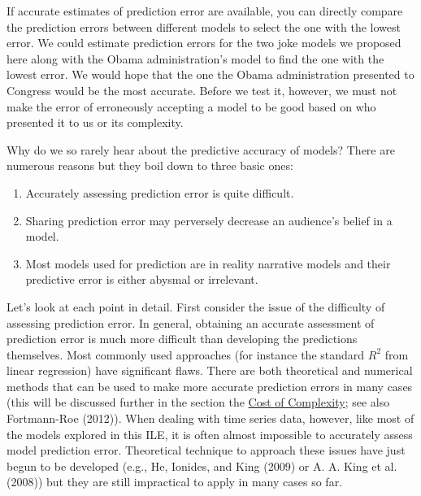 \documentclass[]{memoir}
\begin{document}
If accurate estimates of prediction error are available, you can
directly compare the prediction errors between different models to
select the one with the lowest error. We could estimate prediction
errors for the two joke models we proposed here along with the Obama
administration's model to find the one with the lowest error. We would
hope that the one the Obama administration presented to Congress would
be the most accurate. Before we test it, however, we must not make the
error of erroneously accepting a model to be good based on who presented
it to us or its complexity.

Why do we so rarely hear about the predictive accuracy of models? There
are numerous reasons but they boil down to three basic ones:

\begin{enumerate}
\def\labelenumi{\arabic{enumi}.}
\itemsep1pt\parskip0pt
\item
  Accurately assessing prediction error is quite difficult.
\item
  Sharing prediction error may perversely decrease an audience's belief
  in a model.
\item
  Most models used for prediction are in reality narrative models and
  their predictive error is either abysmal or irrelevant.
\end{enumerate}

Let's look at each point in detail. First consider the issue of the
difficulty of assessing prediction error. In general, obtaining an
accurate assessment of prediction error is much more difficult than
developing the predictions themselves. Most commonly used approaches
(for instance the standard $R^2$ from linear regression) have
significant flaws. There are both theoretical and numerical methods that
can be used to make more accurate prediction errors in many cases (this
will be discussed further in the section the
\hyperref[ComplexityCost]{Cost of Complexity}; see also Fortmann-Roe
(2012)). When dealing with time series data, however, like most of the
models explored in this ILE, it is often almost impossible to accurately
assess model prediction error. Theoretical technique to approach these
issues have just begun to be developed (e.g., He, Ionides, and King
(2009) or A. A. King et al. (2008)) but they are still impractical to
apply in many cases so far.
\end{document}
